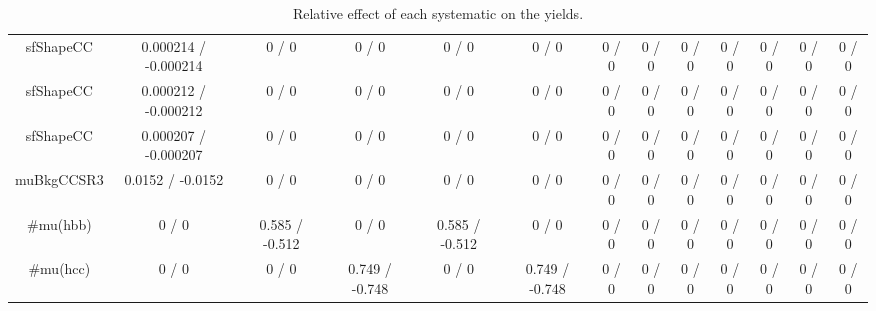 \documentclass[10pt]{article}
\begin{document}
\begin{table}[htbp]
\begin{center}
\begin{tabular}{|c|c|c|c|c|c|c|c|c|c|c|c|c|}
  sfShapeCC & 0.000214 / -0.000214 & 0 / 0 & 0 / 0 & 0 / 0 & 0 / 0 & 0 / 0 & 0 / 0 & 0 / 0 & 0 / 0 & 0 / 0 & 0 / 0 & 0 / 0 \\ 
  sfShapeCC & 0.000212 / -0.000212 & 0 / 0 & 0 / 0 & 0 / 0 & 0 / 0 & 0 / 0 & 0 / 0 & 0 / 0 & 0 / 0 & 0 / 0 & 0 / 0 & 0 / 0 \\ 
  sfShapeCC & 0.000207 / -0.000207 & 0 / 0 & 0 / 0 & 0 / 0 & 0 / 0 & 0 / 0 & 0 / 0 & 0 / 0 & 0 / 0 & 0 / 0 & 0 / 0 & 0 / 0 \\ 
  muBkgCCSR3 & 0.0152 / -0.0152 & 0 / 0 & 0 / 0 & 0 / 0 & 0 / 0 & 0 / 0 & 0 / 0 & 0 / 0 & 0 / 0 & 0 / 0 & 0 / 0 & 0 / 0 \\ 
  #mu(hbb) & 0 / 0 & 0.585 / -0.512 & 0 / 0 & 0.585 / -0.512 & 0 / 0 & 0 / 0 & 0 / 0 & 0 / 0 & 0 / 0 & 0 / 0 & 0 / 0 & 0 / 0 \\ 
  #mu(hcc) & 0 / 0 & 0 / 0 & 0.749 / -0.748 & 0 / 0 & 0.749 / -0.748 & 0 / 0 & 0 / 0 & 0 / 0 & 0 / 0 & 0 / 0 & 0 / 0 & 0 / 0 \\ 
\hline 
\end{tabular} 
\caption{Relative effect of each systematic on the yields.} 
\end{center} 
\end{table} 
\end{document}
